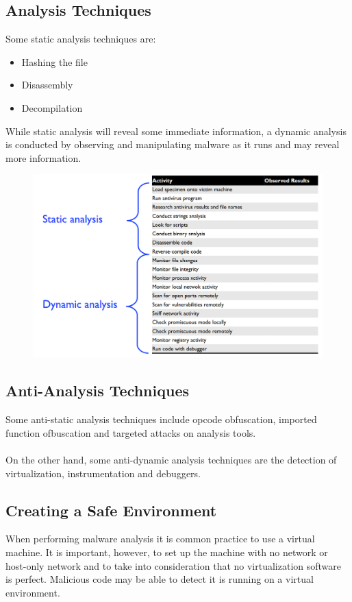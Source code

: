 \documentclass[10pt,a4paper]{report}
\begin{document}
\subsection{Analysis Techniques}
Some static analysis techniques are:
\begin{itemize}
\item Hashing the file
\item Disassembly
\item Decompilation
\end{itemize}
While static analysis will reveal some immediate information, a dynamic analysis  is conducted by observing and manipulating malware as it runs and may reveal more information.
\begin{figure}[H]
\centering
\includegraphics[scale=0.3]{27.png}
\end{figure}
\subsection{Anti-Analysis Techniques}
Some anti-static analysis techniques include opcode obfuscation, imported function ofbuscation and targeted attacks on analysis tools.\\
\\
On the other hand, some anti-dynamic analysis techniques are the detection of virtualization, instrumentation and debuggers.
\subsection{Creating a Safe Environment}
When performing malware analysis it is common practice to use a virtual machine. It is important, however, to set up the machine with no network or host-only network and to take into consideration that no virtualization software is perfect. Malicious code may be able to detect it is running on a virtual environment.
\end{document}
